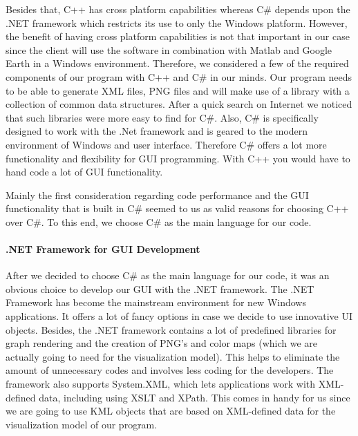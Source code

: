 Besides that, C++ has cross platform capabilities whereas C\# depends upon the .NET framework which restricts its use to only the Windows platform. However, the benefit of having cross platform capabilities is not that important in our case since the client will use the software in combination with Matlab and Google Earth in a Windows environment. Therefore, we considered a few of the required components of our program with C++ and C\# in our minds. Our program needs to be able to generate XML files, PNG files and will make use of a library with a collection of common data structures. After a quick search on Internet we noticed that such libraries were more easy to find for C\#. Also, C\# is specifically designed to work with the .Net framework and is geared to the modern environment of Windows and user interface. Therefore C\# offers a lot more functionality and flexibility for GUI programming. With C++ you would have to hand code a lot of GUI functionality.

Mainly the first consideration regarding code performance and the GUI functionality that is built in C\# seemed to us as valid reasons for choosing C++ over C\#. To this end, we choose C\# as the main language for our code.

\paragraph{.NET Framework for GUI Development}
After we decided to choose C\# as the main language for our code, it was an obvious choice to develop our GUI with the .NET framework. The .NET Framework has become the mainstream environment for new Windows applications. It offers a lot of fancy options in case we decide to use innovative UI objects. Besides, the .NET framework contains a lot of predefined libraries for graph rendering and the creation of PNG's and color maps (which we are actually going to need for the visualization model). This helps to eliminate the amount of unnecessary codes and involves less coding for the developers. The framework also supports System.XML, which lets applications work with XML-defined data, including using XSLT and XPath. This comes in handy for us since we are going to use KML objects that are based on XML-defined data for the visualization model of our program.


